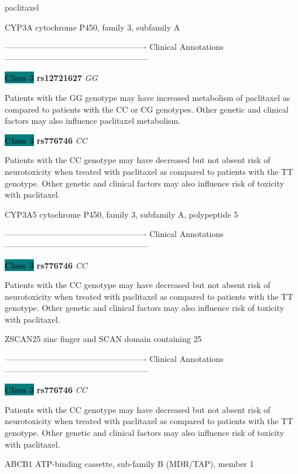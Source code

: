 \documentclass{resume} %
\begin{document}
\begin{rSection}{ paclitaxel }
\begin{rSubsection}{ CYP3A }{ cytochrome P450, family 3, subfamily A }{}{}
\item[] ---------------------------------------------------- Clinical Annotations -----------------------------------------------------\newline
\item \textbf{\colorbox{teal} {Class 3}} \textbf{ rs12721627 } \textit{ GG }
\item[] Patients with the GG genotype may have increased metabolism of paclitaxel as compared to patients with the CC or CG genotypes. Other genetic and clinical factors may also influence paclitaxel metabolism.\item \textbf{\colorbox{teal} {Class 3}} \textbf{ rs776746 } \textit{ CC }
\item[] Patients with the CC genotype may have decreased but not absent risk of neurotoxicity when treated with paclitaxel as compared to patients with the TT genotype. Other genetic and clinical factors may also influence risk of toxicity with paclitaxel.
\end{rSubsection}\begin{rSubsection}{ CYP3A5 }{ cytochrome P450, family 3, subfamily A, polypeptide 5 }{}{}
\item[]

\item[] ---------------------------------------------------- Clinical Annotations -----------------------------------------------------\newline
\item \textbf{\colorbox{teal} {Class 3}} \textbf{ rs776746 } \textit{ CC }
\item[] Patients with the CC genotype may have decreased but not absent risk of neurotoxicity when treated with paclitaxel as compared to patients with the TT genotype. Other genetic and clinical factors may also influence risk of toxicity with paclitaxel.
\end{rSubsection}\begin{rSubsection}{ ZSCAN25 }{ zinc finger and SCAN domain containing 25 }{}{}
\item[]

\item[] ---------------------------------------------------- Clinical Annotations -----------------------------------------------------\newline
\item \textbf{\colorbox{teal} {Class 3}} \textbf{ rs776746 } \textit{ CC }
\item[] Patients with the CC genotype may have decreased but not absent risk of neurotoxicity when treated with paclitaxel as compared to patients with the TT genotype. Other genetic and clinical factors may also influence risk of toxicity with paclitaxel.
\end{rSubsection}\begin{rSubsection}{ ABCB1 }{ ATP-binding cassette, sub-family B (MDR/TAP), member 1 }{}{}
\item[]


\end{rSubsection}
\end{rSection}
\end{document}

